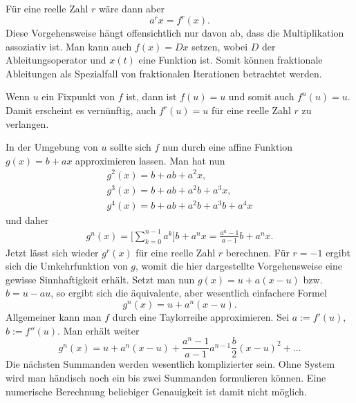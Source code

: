 \documentclass[a4paper,10pt,fleqn,twocolumn,twoside]{article}
\numberwithin{equation}{section}
\begin{document}
Für eine reelle Zahl $r$ wäre dann aber
\begin{equation}
a^r x = f^r(x).
\end{equation}
Diese Vorgehensweise hängt offensichtlich nur davon ab, dass
die Multiplikation assoziativ ist. Man kann auch $f(x)=Dx$ setzen,
wobei $D$ der Ableitungsoperator und $x(t)$ eine Funktion ist.
Somit können fraktionale Ableitungen als Spezialfall von
fraktionalen Iterationen betrachtet werden.

Wenn $u$ ein Fixpunkt von $f$ ist, dann ist $f(u)=u$ und
somit auch $f^n(u)=u$. Damit erscheint es vernünftig, auch
$f^r(u)=u$ für eine reelle Zahl $r$ zu verlangen.

In der Umgebung von $u$ sollte sich $f$ nun durch eine
affine Funktion $g(x)=b+ax$ approximieren lassen. Man hat
nun
\begin{gather*}
g^2(x) = b+ab+a^2x,\\
g^3(x) = b+ab+a^2b+a^3x,\\
g^4(x) = b+ab+a^2b+a^3b+a^4x
\end{gather*}
und daher
\begin{gather*}
g^n(x) = \bigg[\sum_{k=0}^{n-1}a^k\bigg]b+a^nx
= \frac{a^n-1}{a-1}b+a^nx.
\end{gather*}
Jetzt lässt sich wieder $g^r(x)$ für eine reelle Zahl $r$
berechnen. Für $r=-1$ ergibt sich die Umkehrfunktion von $g$,
womit die hier dargestellte Vorgehensweise eine gewisse Sinnhaftigkeit
erhält. Setzt man nun $g(x)=u+a(x-u)$ bzw. $b=u-au$, so ergibt
sich die äquivalente, aber wesentlich einfachere Formel
\begin{equation}
g^n(x) = u+a^n(x-u).
\end{equation}
Allgemeiner kann man $f$ durch eine Taylorreihe approximieren.
Sei $a:=f'(u)$, $b:=f''(u)$. Man erhält weiter
\[g^n(x) = u+a^n(x-u)
+\frac{a^n-1}{a-1}a^{n-1}\frac{b}{2}(x-u)^2+\ldots\]
Die nächsten Summanden werden wesentlich komplizierter sein. Ohne
System wird man händisch noch ein bis zwei Summanden formulieren
können. Eine numerische Berechnung beliebiger Genauigkeit ist damit
nicht möglich.
\end{document}
